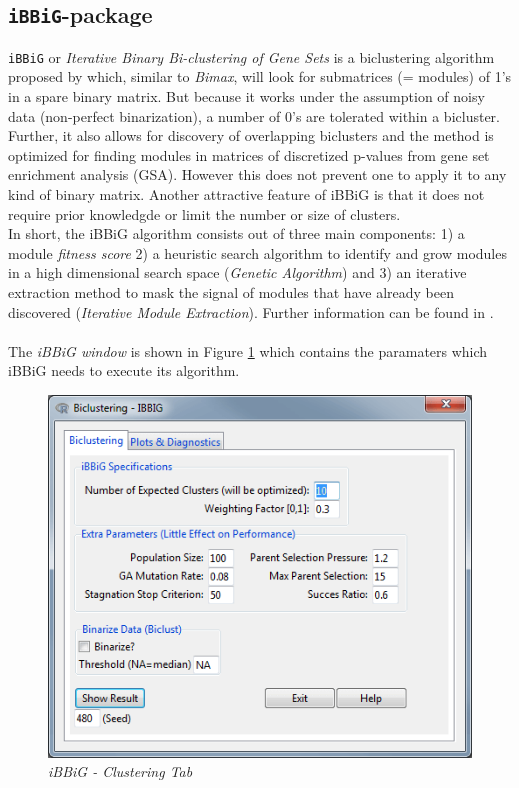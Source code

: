 \documentclass[a4paper]{article}\usepackage[]{graphicx}\usepackage[]{color}
\begin{document}
\subsection{\texttt{iBBiG}-package}
\verb|iBBiG| or {\it Iterative Binary Bi-clustering of Gene Sets} is a
biclustering algorithm proposed by \citet{Gustenleitner2012} which,
similar to {\it Bimax}, will look for submatrices (= modules) of 1's in a spare
binary matrix. But because it works under the assumption of noisy data (non-perfect
binarization), a number of 0's are tolerated within a bicluster. 
Further, it also allows for discovery of overlapping biclusters and the method
is optimized for finding modules in matrices of discretized p-values from gene
set enrichment analysis (GSA). However this does not prevent one to apply it to
any kind of binary matrix. Another attractive feature of iBBiG is that it does
not require prior knowledgde or limit the number or size of clusters.\\
In short, the iBBiG algorithm consists out of three main components: 1) a module
{\it fitness score} 2) a heuristic search algorithm to identify and grow modules
in a high dimensional search space ({\it Genetic Algorithm}) and 3) an iterative
extraction method to mask the signal of modules that have already been
discovered ({\it Iterative Module Extraction}). Further information can be found
in \citet{Gustenleitner2012}.
\\ \\
\noindent The {\it iBBiG window} is shown in Figure \ref{ibbig_clusttab} which
contains the paramaters which iBBiG needs to execute its algorithm.
\begin{figure}[H]
\centering
\includegraphics[scale=0.5]{figures/ibbig_clusttab.png}
\caption{{\it iBBiG - Clustering Tab}\label{ibbig_clusttab}}
\end{figure}
\end{document}

